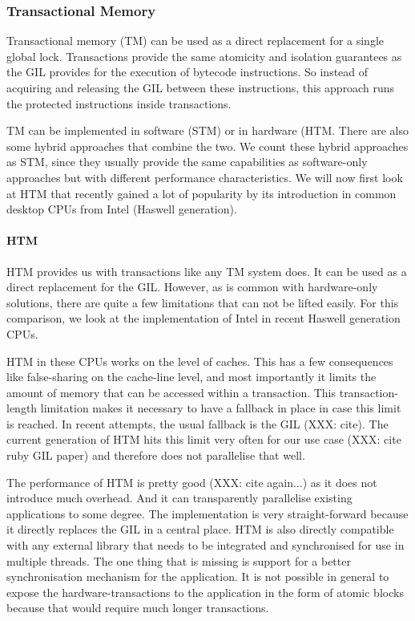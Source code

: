 \documentclass{sigplanconf}
\begin{document}


\subsubsection{Transactional Memory}
Transactional memory (TM) can be used as a direct replacement for a
single global lock. Transactions provide the same atomicity and
isolation guarantees as the GIL provides for the execution of bytecode
instructions. So instead of acquiring and releasing the GIL between
these instructions, this approach runs the protected instructions
inside transactions.

TM can be implemented in software (STM) or in hardware (HTM. There are
also some hybrid approaches that combine the two. We count these
hybrid approaches as STM, since they usually provide the same
capabilities as software-only approaches but with different
performance characteristics. We will now first look at HTM that
recently gained a lot of popularity by its introduction in common
desktop CPUs from Intel (Haswell generation).

\paragraph{HTM}

HTM provides us with transactions like any TM system does. It can
be used as a direct replacement for the GIL. However, as is common
with hardware-only solutions, there are quite a few limitations
that can not be lifted easily. For this comparison, we look at
the implementation of Intel in recent Haswell generation CPUs.

HTM in these CPUs works on the level of caches. This has a few
consequences like false-sharing on the cache-line level, and most
importantly it limits the amount of memory that can be accessed within
a transaction. This transaction-length limitation makes it necessary
to have a fallback in place in case this limit is reached. In recent
attempts, the usual fallback is the GIL (XXX: cite). The current
generation of HTM hits this limit very often for our use case (XXX:
cite ruby GIL paper) and therefore does not parallelise that well.

The performance of HTM is pretty good (XXX: cite again...) as it does
not introduce much overhead. And it can transparently parallelise
existing applications to some degree. The implementation is very
straight-forward because it directly replaces the GIL in a central
place. HTM is also directly compatible with any external library that
needs to be integrated and synchronised for use in multiple
threads. The one thing that is missing is support for a better
synchronisation mechanism for the application. It is not possible
in general to expose the hardware-transactions to the application
in the form of atomic blocks because that would require much
longer transactions. 
\end{document}
